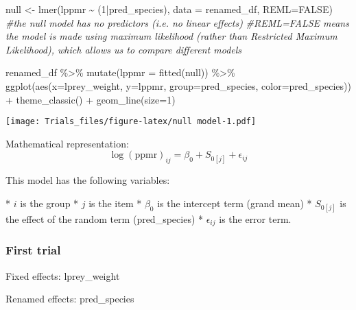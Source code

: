 \documentclass[
]{article}
\newenvironment{Shaded}{\begin{snugshade}}{\end{snugshade}}
\newcommand{\AttributeTok}[1]{\textcolor[rgb]{0.77,0.63,0.00}{#1}}
\newcommand{\CommentTok}[1]{\textcolor[rgb]{0.56,0.35,0.01}{\textit{#1}}}
\newcommand{\ConstantTok}[1]{\textcolor[rgb]{0.00,0.00,0.00}{#1}}
\newcommand{\DecValTok}[1]{\textcolor[rgb]{0.00,0.00,0.81}{#1}}
\newcommand{\FunctionTok}[1]{\textcolor[rgb]{0.00,0.00,0.00}{#1}}
\newcommand{\NormalTok}[1]{#1}
\newcommand{\OtherTok}[1]{\textcolor[rgb]{0.56,0.35,0.01}{#1}}
\newcommand{\SpecialCharTok}[1]{\textcolor[rgb]{0.00,0.00,0.00}{#1}}
\begin{document}
\begin{Shaded}
\begin{Highlighting}[]
\NormalTok{null }\OtherTok{\textless{}{-}} \FunctionTok{lmer}\NormalTok{(lppmr }\SpecialCharTok{\textasciitilde{}}\NormalTok{ (}\DecValTok{1}\SpecialCharTok{|}\NormalTok{pred\_species), }\AttributeTok{data =}\NormalTok{ renamed\_df, }\AttributeTok{REML=}\ConstantTok{FALSE}\NormalTok{)}
\CommentTok{\#the \textquotesingle{}null\textquotesingle{} model has no predictors (i.e. no linear effects)}
\CommentTok{\#REML=FALSE means the model is made using \textquotesingle{}maximum likelihood\textquotesingle{} (rather than Restricted Maximum Likelihood), which allows us to compare different models}

\NormalTok{renamed\_df }\SpecialCharTok{\%\textgreater{}\%} 
    \FunctionTok{mutate}\NormalTok{(}\AttributeTok{lppmr =} \FunctionTok{fitted}\NormalTok{(null)) }\SpecialCharTok{\%\textgreater{}\%} 
    \FunctionTok{ggplot}\NormalTok{(}\FunctionTok{aes}\NormalTok{(}\AttributeTok{x=}\NormalTok{lprey\_weight, }\AttributeTok{y=}\NormalTok{lppmr, }\AttributeTok{group=}\NormalTok{pred\_species, }\AttributeTok{color=}\NormalTok{pred\_species)) }\SpecialCharTok{+}
    \FunctionTok{theme\_classic}\NormalTok{() }\SpecialCharTok{+}
    \FunctionTok{geom\_line}\NormalTok{(}\AttributeTok{size=}\DecValTok{1}\NormalTok{) }
\end{Highlighting}
\end{Shaded}

\texttt{[image: Trials\_files/figure-latex/null model-1.pdf]}

Mathematical representation: \[
    \log(\text{ppmr})_{ij} = \beta_{0} + S_{0[j]} + \epsilon_{ij}
\]

This model has the following variables:

\begin{itemize}
  * $i$ is the group
  * $j$ is the item
  * $\beta_{0}$ is the intercept term (grand mean)
  * $S_{0[j]}$ is the effect of the random term (pred_species)
  * $\epsilon_{ij}$ is the error term.
\end{itemize}

\hypertarget{first-trial}{%
\subsubsection{First trial}\label{first-trial}}

Fixed effects: lprey\_weight

Renamed effects: pred\_species
\end{document}
